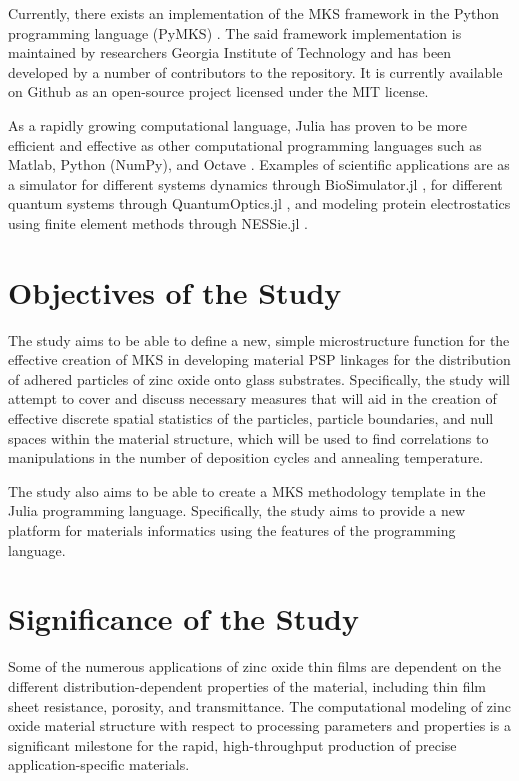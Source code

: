 Currently, there exists an implementation of the MKS framework in the Python programming language (PyMKS) \cite{pymks}. The said framework implementation is maintained by researchers Georgia Institute of Technology and has been developed by a number of contributors to the repository. It is currently available on Github as an open-source project licensed under the MIT license.

As a rapidly growing computational language, Julia has proven to be more efficient and effective as other computational programming languages such as Matlab, Python (NumPy), and Octave \cite{julia15}. Examples of scientific applications are as a simulator for different systems dynamics through BioSimulator.jl \cite{biosim}, for different quantum systems through QuantumOptics.jl \cite{qoptics}, and modeling protein electrostatics using finite element methods through NESSie.jl \cite{nessie}.

\section{Objectives of the Study}
The study aims to be able to define a new, simple microstructure function for the effective creation of MKS in developing material PSP linkages for the distribution of adhered particles of zinc oxide onto glass substrates.
Specifically, the study will attempt to cover and discuss necessary measures that will aid in the creation of effective discrete spatial statistics of the particles, particle boundaries, and null spaces within the material structure, which will be used to find correlations to manipulations in the number of deposition cycles and annealing temperature.

The study also aims to be able to create a MKS methodology template in the Julia programming language.
Specifically, the study aims to provide a new platform for materials informatics using the features of the programming language.


\section{Significance of the Study}
Some of the numerous applications of zinc oxide thin films are dependent on the different distribution-dependent properties of the material, including thin film sheet resistance, porosity, and transmittance.
The computational modeling of zinc oxide material structure with respect to processing parameters and properties is a significant milestone for the rapid, high-throughput production of precise application-specific materials.

